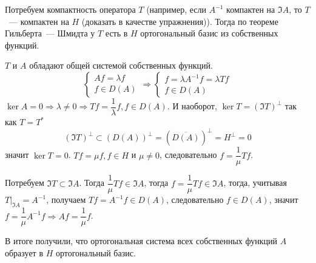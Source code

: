 \documentclass[14pt]{extarticle}
\begin{document}
Потребуем компактность оператора $T$ (например, если $A^{-1}$ компактен на $\Im A$,
то $T$~--- компактен на $H$ (доказать в качестве упражнения)).
Тогда по теореме Гильберта~--- Шмидта у $T$ есть в $H$ ортогональный базис из
собственных функций.

$T$ и $A$ обладают общей системой собственных функций.
$$
    \left\{
    \begin{array}{l}
        Af = \lambda f\\
        f \in D(A)
    \end{array}
    \right. \Rightarrow
    \left\{
    \begin{array}{l}
        f = \lambda A^{-1}f = \lambda T f\\
        f \in D(A)
    \end{array}
    \right.
$$
$\ker A = 0 \Rightarrow \lambda \ne 0 \Rightarrow Tf = \dfrac{1}{\lambda}f, f \in D(A)$.
И наоборот, $\ker T = (\Im T)^\perp$ так как $T = T^*$
$$
(\Im T)^\perp \subset (D(A))^\perp = \left(\overline{D(A)}\right)^\perp = H^\perp = 0
$$
значит $\ker T = 0$.
$Tf =\mu f, f \in H$ и $\mu \ne 0$, следовательно $f = \dfrac{1}{\mu}Tf$.

Потребуем $\Im T \subset \Im A$.
Тогда $\dfrac{1}{\mu}Tf \in \Im A$, тогда $f = \dfrac{1}{\mu}Tf \in \Im A$, тогда, учитывая
$T|_{\Im A} = A^{-1}$,  получаем $Tf = A^{-1}f \in 
D(A)$, следовательно $f \in D(A)$, значит $f = \dfrac{1}{\mu}A^{-1}f \Rightarrow Af =\dfrac{1}
{\mu}f$.

В итоге получили, что ортогональная система всех собственных функций $A$ образует
в $H$ ортогональный базис.
\end{document}
